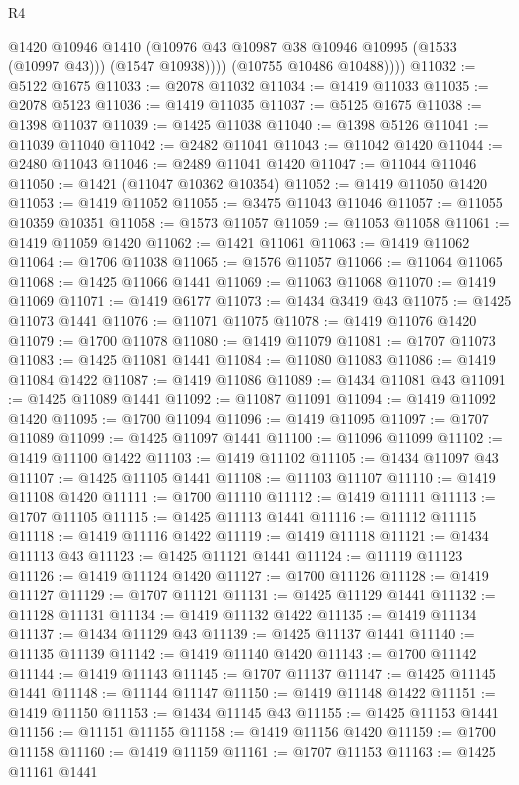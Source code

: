 \begin{lexlean}{R4}
\begin{coremodule}
                @1420
                @10946
                @1410
                (@10976 @43 @10987 @38 @10946 @10995 (@1533 (@10997 @43)))
                (@1547 @10938))))
          (@10755 @10486 @10488))))
@11032 := @5122 @1675
@11033 := @2078 @11032
@11034 := @1419 @11033
@11035 := @2078 @5123
@11036 := @1419 @11035
@11037 := @5125 @1675
@11038 := @1398 @11037
@11039 := @1425 @11038
@11040 := @1398 @5126
@11041 := @11039 @11040
@11042 := @2482 @11041
@11043 := @11042 @1420
@11044 := @2480 @11043
@11046 := @2489 @11041 @1420
@11047 := @11044 @11046
@11050 := @1421 (@11047 @10362 @10354)
@11052 := @1419 @11050 @1420
@11053 := @1419 @11052
@11055 := @3475 @11043 @11046
@11057 := @11055 @10359 @10351
@11058 := @1573 @11057
@11059 := @11053 @11058
@11061 := @1419 @11059 @1420
@11062 := @1421 @11061
@11063 := @1419 @11062
@11064 := @1706 @11038
@11065 := @1576 @11057
@11066 := @11064 @11065
@11068 := @1425 @11066 @1441
@11069 := @11063 @11068
@11070 := @1419 @11069
@11071 := @1419 @6177
@11073 := @1434 @3419 @43
@11075 := @1425 @11073 @1441
@11076 := @11071 @11075
@11078 := @1419 @11076 @1420
@11079 := @1700 @11078
@11080 := @1419 @11079
@11081 := @1707 @11073
@11083 := @1425 @11081 @1441
@11084 := @11080 @11083
@11086 := @1419 @11084 @1422
@11087 := @1419 @11086
@11089 := @1434 @11081 @43
@11091 := @1425 @11089 @1441
@11092 := @11087 @11091
@11094 := @1419 @11092 @1420
@11095 := @1700 @11094
@11096 := @1419 @11095
@11097 := @1707 @11089
@11099 := @1425 @11097 @1441
@11100 := @11096 @11099
@11102 := @1419 @11100 @1422
@11103 := @1419 @11102
@11105 := @1434 @11097 @43
@11107 := @1425 @11105 @1441
@11108 := @11103 @11107
@11110 := @1419 @11108 @1420
@11111 := @1700 @11110
@11112 := @1419 @11111
@11113 := @1707 @11105
@11115 := @1425 @11113 @1441
@11116 := @11112 @11115
@11118 := @1419 @11116 @1422
@11119 := @1419 @11118
@11121 := @1434 @11113 @43
@11123 := @1425 @11121 @1441
@11124 := @11119 @11123
@11126 := @1419 @11124 @1420
@11127 := @1700 @11126
@11128 := @1419 @11127
@11129 := @1707 @11121
@11131 := @1425 @11129 @1441
@11132 := @11128 @11131
@11134 := @1419 @11132 @1422
@11135 := @1419 @11134
@11137 := @1434 @11129 @43
@11139 := @1425 @11137 @1441
@11140 := @11135 @11139
@11142 := @1419 @11140 @1420
@11143 := @1700 @11142
@11144 := @1419 @11143
@11145 := @1707 @11137
@11147 := @1425 @11145 @1441
@11148 := @11144 @11147
@11150 := @1419 @11148 @1422
@11151 := @1419 @11150
@11153 := @1434 @11145 @43
@11155 := @1425 @11153 @1441
@11156 := @11151 @11155
@11158 := @1419 @11156 @1420
@11159 := @1700 @11158
@11160 := @1419 @11159
@11161 := @1707 @11153
@11163 := @1425 @11161 @1441

\end{coremodule}
\end{lexlean}
